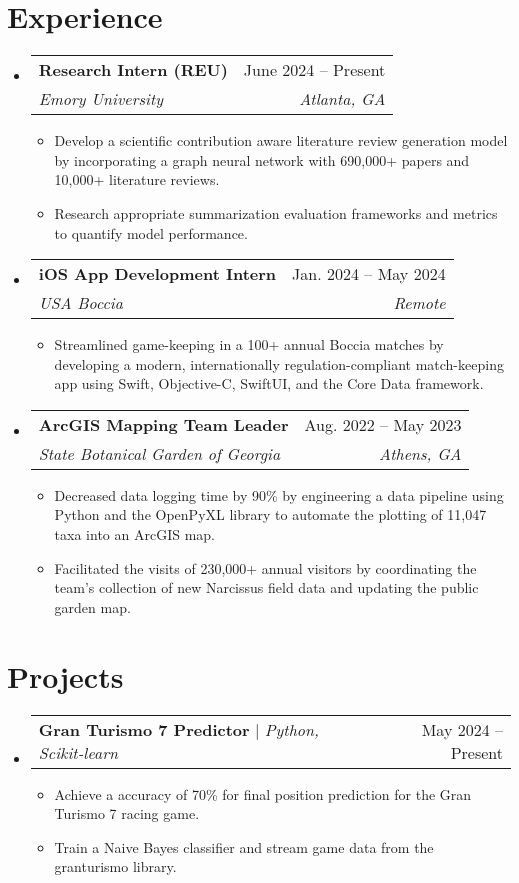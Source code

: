 \documentclass[letterpaper,11pt]{article}
\makeatletter
\newcommand{\resumeItem}[1]{
  \item\small{
    {#1 \vspace{-2pt}}
  }
}
\newcommand{\resumeSubheading}[4]{
  \vspace{-2pt}\item
    \begin{tabular*}{0.97\textwidth}[t]{l@{\extracolsep{\fill}}r}
      \textbf{#1} & #2 \\
      \textit{\small#3} & \textit{\small #4} \\
    \end{tabular*}\vspace{-7pt}
}
\newcommand{\resumeSubSubheading}[2]{
    \item
    \begin{tabular*}{0.97\textwidth}{l@{\extracolsep{\fill}}r}
      \textit{\small#1} & \textit{\small #2} \\
    \end{tabular*}\vspace{-7pt}
}
\newcommand{\resumeProjectHeading}[2]{
    \item
    \begin{tabular*}{0.97\textwidth}{l@{\extracolsep{\fill}}r}
      \small#1 & #2 \\
    \end{tabular*}\vspace{-7pt}
}
\newcommand{\resumeSubHeadingListStart}{\begin{itemize}[leftmargin=0.15in, label={}]}
\newcommand{\resumeSubHeadingListEnd}{\end{itemize}}
\newcommand{\resumeItemListStart}{\begin{itemize}}
\newcommand{\resumeItemListEnd}{\end{itemize}\vspace{-5pt}}
\makeatother
\begin{document}
\section{Experience}
  \resumeSubHeadingListStart

    \resumeSubheading
      {Research Intern (REU)}{June 2024 -- Present}
      {Emory University}{Atlanta, GA}
      \resumeItemListStart
        \resumeItem{Develop a scientific contribution aware literature review generation model by incorporating a graph neural network with 690,000+ papers and 10,000+ literature reviews.}
        \resumeItem{Research appropriate summarization evaluation frameworks and metrics to quantify model performance.}
      \resumeItemListEnd

    \resumeSubheading
      {iOS App Development Intern}{Jan. 2024 -- May 2024}
      {USA Boccia}{Remote}
      \resumeItemListStart
        \resumeItem{Streamlined game-keeping in a 100+ annual Boccia matches by developing a modern, internationally regulation-compliant match-keeping app using Swift, Objective-C, SwiftUI, and the Core Data framework.}
      \resumeItemListEnd
      

    \resumeSubheading
      {ArcGIS Mapping Team Leader}{Aug. 2022 -- May 2023}
      {State Botanical Garden of Georgia}{Athens, GA}
      \resumeItemListStart
        \resumeItem{Decreased data logging time by 90\% by engineering a data pipeline using Python and the OpenPyXL library to automate the plotting of 11,047 taxa into an ArcGIS map.}
        \resumeItem{Facilitated the visits of 230,000+ annual visitors by coordinating the team's collection of new Narcissus field data and updating the public garden map.}
    \resumeItemListEnd



  \resumeSubHeadingListEnd


\section{Projects}
    \resumeSubHeadingListStart
      \resumeProjectHeading
          {\textbf{Gran Turismo 7 Predictor} $|$ \emph{Python, Scikit-learn}}{May 2024 -- Present}
          \resumeItemListStart
            \resumeItem{Achieve a accuracy of 70\% for final position prediction for the Gran Turismo 7 racing game.}
            \resumeItem{Train a Naive Bayes classifier and stream game data from the granturismo library.}
          \resumeItemListEnd
    \resumeSubHeadingListEnd
\end{document}
